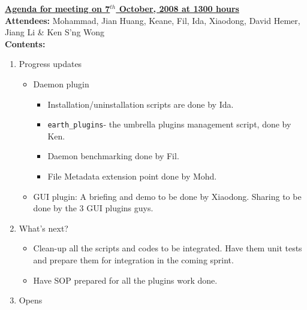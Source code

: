\documentclass{letter}
\begin{document}
{\large \textbf{\underline{Agenda for meeting on 7$^{th}$ October, 2008 at 1300 hours}}}\\

\textbf{Attendees:} Mohammad, Jian Huang, Keane, Fil, Ida, Xiaodong, David Hemer, Jiang Li \& Ken S'ng Wong \\

\textbf{Contents:}

\begin{enumerate}
    \item Progress updates
        \begin{itemize}
            \item Daemon plugin
                \begin{itemize}
                    \item Installation/uninstallation scripts are done by Ida.
                    \item \texttt{earth\_plugins}- the umbrella plugins management script, done by Ken.
                    \item Daemon benchmarking done by Fil.
                    \item File Metadata extension point done by Mohd. 
                \end{itemize}
            \item GUI plugin: A briefing and demo to be done by Xiaodong. Sharing to be done by the 3 GUI plugins guys. 
        \end{itemize}
    \item What's next?
        \begin{itemize}
            \item Clean-up all the scripts and codes to be integrated. Have them unit tests and prepare them for integration in the coming sprint. 
            \item Have SOP prepared for all the plugins work done. 
        \end{itemize}
    \item Opens
\end{enumerate}
\end{document}
